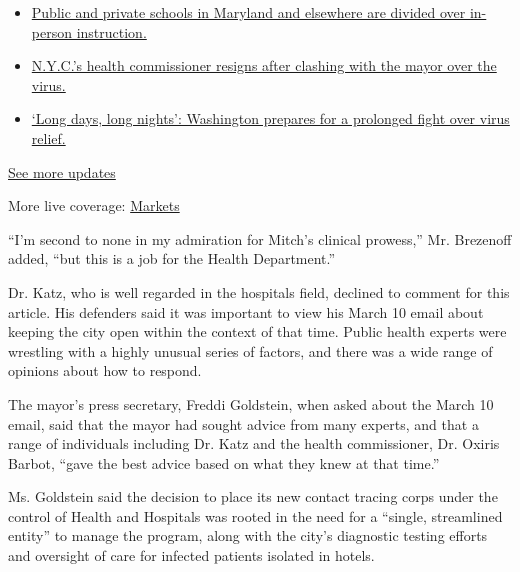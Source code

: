 \begin{itemize}
\tightlist
\item
  \href{https://www.nytimes.com/2020/08/04/world/coronavirus-cases.html?action=click\&pgtype=Article\&state=default\&region=MAIN_CONTENT_1\&context=storylines_live_updates\#link-4825b93}{Public
  and private schools in Maryland and elsewhere are divided over
  in-person instruction.}
\item
  \href{https://www.nytimes.com/2020/08/04/world/coronavirus-cases.html?action=click\&pgtype=Article\&state=default\&region=MAIN_CONTENT_1\&context=storylines_live_updates\#link-4d1eafa8}{N.Y.C.'s
  health commissioner resigns after clashing with the mayor over the
  virus.}
\item
  \href{https://www.nytimes.com/2020/08/04/world/coronavirus-cases.html?action=click\&pgtype=Article\&state=default\&region=MAIN_CONTENT_1\&context=storylines_live_updates\#link-6b644638}{`Long
  days, long nights': Washington prepares for a prolonged fight over
  virus relief.}
\end{itemize}

\href{https://www.nytimes.com/2020/08/04/world/coronavirus-cases.html?action=click\&pgtype=Article\&state=default\&region=MAIN_CONTENT_1\&context=storylines_live_updates}{See
more updates}

More live coverage:
\href{https://www.nytimes.com/live/2020/08/04/business/stock-market-today-coronavirus?action=click\&pgtype=Article\&state=default\&region=MAIN_CONTENT_1\&context=storylines_live_updates}{Markets}

``I'm second to none in my admiration for Mitch's clinical prowess,''
Mr. Brezenoff added, ``but this is a job for the Health Department.''

Dr. Katz, who is well regarded in the hospitals field, declined to
comment for this article. His defenders said it was important to view
his March 10 email about keeping the city open within the context of
that time. Public health experts were wrestling with a highly unusual
series of factors, and there was a wide range of opinions about how to
respond.

The mayor's press secretary, Freddi Goldstein, when asked about the
March 10 email, said that the mayor had sought advice from many experts,
and that a range of individuals including Dr. Katz and the health
commissioner, Dr. Oxiris Barbot, ``gave the best advice based on what
they knew at that time.''

Ms. Goldstein said the decision to place its new contact tracing corps
under the control of Health and Hospitals was rooted in the need for a
``single, streamlined entity'' to manage the program, along with the
city's diagnostic testing efforts and oversight of care for infected
patients isolated in hotels.

